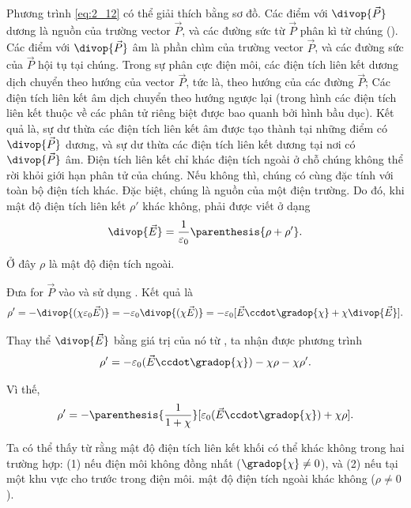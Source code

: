 Phương trình \eqref{eq:2_12} có thể giải thích bằng sơ đồ. Các điểm với $\divop{\vec{P}}$ dương là nguồn của trường vector $\vec{P}$, và các đường sức từ $\vec{P}$ phân kì từ chúng (). Các điểm với $\divop{\vec{P}}$ âm là phần chìm của trường vector $\vec{P}$, và các đường sức của $\vec{P}$ hội tụ tại chúng.
Trong sự phân cực điện môi, các điện tích liên kết dương dịch chuyển theo hướng của vector $\vec{P}$, tức là, theo hướng của các đường $\vec{P}$; Các điện tích liên kết âm dịch chuyển theo hướng ngược lại (trong hình các điện tích liên kết thuộc về các phân tử riêng biệt được bao quanh bởi hình bầu dục). Kết quả là, sự dư thừa các điện tích liên kết âm được tạo thành tại những điểm có $\divop{\vec{P}}$ dương, và sự dư thừa các điện tích liên kết dương tại nơi có $\divop{\vec{P}}$ âm.
 Điện tích liên kết chỉ khác điện tích ngoài ở chỗ chúng không thể rời khỏi giới hạn phân tử của chúng. Nếu không thì, chúng có cùng đặc tính với toàn bộ điện tích khác. Đặc biệt, chúng là nguồn của một điện trường. Do đó, khi mật độ điện tích liên kết $\rho'$ khác không,  phải được viết ở dạng
\begin{equation}\label{eq:2_13}
    \divop{\vec{E}} = \frac{1}{\varepsilon_0} \parenthesis{\rho + \rho'}.
\end{equation}

\noindent
Ở đây $\rho$ là mật độ điện tích ngoài.

Đưa  for $\vec{P}$ vào  và sử dụng . Kết quả là
\begin{equation*}
    \rho' = - \divop{(\chi\varepsilon_0\vec{E})} = - \varepsilon_0 \divop{(\chi\vec{E})} = - \varepsilon_0 [\vec{E}\ccdot\gradop{\chi} + \chi \divop{\vec{E}}].
\end{equation*}

\noindent
Thay thể $\divop{\vec{E}}$ bằng giá trị của nó từ , ta nhận được phương trình
\begin{equation*}
    \rho' = - \varepsilon_0 (\vec{E}\ccdot\gradop{\chi}) - \chi\rho - \chi\rho'.
\end{equation*}

\noindent
Vì thế,
\begin{equation}\label{eq:2_14}
    \rho' = - \parenthesis{\frac{1}{1+\chi}} [\varepsilon_0 (\vec{E}\ccdot\gradop{\chi}) + \chi\rho].
\end{equation}

Ta có thể thấy từ  rằng mật độ điện tích liên kết khối có thể khác không trong hai trường hợp: (1) nếu điện môi không đồng nhất ($\gradop{\chi}\neq 0$), và (2) nếu tại một khu vực cho trước trong điện môi. mật độ điện tích ngoài khác không ($\rho\neq 0$).

